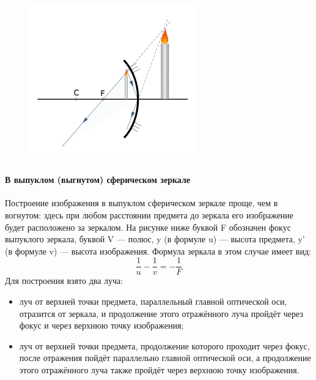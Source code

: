 \documentclass[11pt]{article}
\begin{document}
\begin{enumerate}
\begin{figure}[!ht]
					\includegraphics[width=\linewidth]{assets/mirrors/sphere_mirror4.png}
				\endminipage
			\end{figure}
			\paragraph{В выпуклом (выгнутом) сферическом зеркале}
			Построение изображения в выпуклом сферическом зеркале проще, чем в вогнутом: здесь при любом расстоянии предмета до зеркала его изображение будет расположено за зеркалом. На рисунке ниже буквой F обозначен фокус выпуклого зеркала, буквой V — полюс, y (в формуле u) — высота предмета, y' (в формуле v) — высота изображения. Формула зеркала в этом случае имеет вид:
			$$
				\frac{1}{u} - \frac {1}{v} = -\frac{1}{F}
			$$
			Для построения взято два луча:
			\begin{itemize}
				\item луч от верхней точки предмета, параллельный главной оптической оси, отразится от зеркала, и продолжение этого отражённого луча пройдёт через фокус и через верхнюю точку изображения;
				\item луч от верхней точки предмета, продолжение которого проходит через фокус, после отражения пойдёт параллельно главной оптической оси, а продолжение этого отражённого луча также пройдёт через верхнюю точку изображения.
			\end{itemize}


\end{enumerate}
\end{document}
